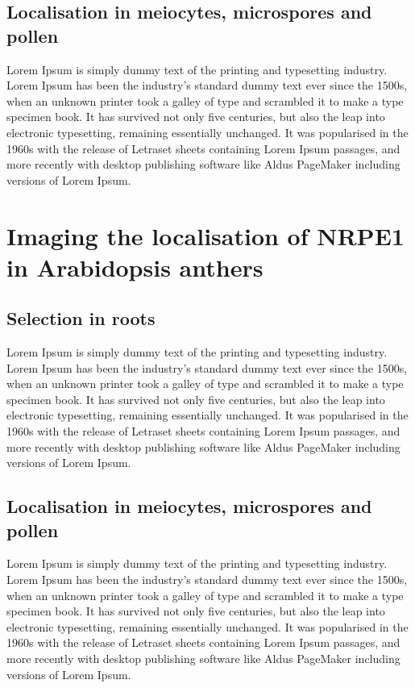 \subsection{Localisation in meiocytes, microspores and pollen}
Lorem Ipsum is simply dummy text of the printing and typesetting industry. Lorem Ipsum has been the industry's standard dummy text ever since the 1500s, when an unknown printer took a galley of type and scrambled it to make a type specimen book. It has survived not only five centuries, but also the leap into electronic typesetting, remaining essentially unchanged. It was popularised in the 1960s with the release of Letraset sheets containing Lorem Ipsum passages, and more recently with desktop publishing software like Aldus PageMaker including versions of Lorem Ipsum.

\section{Imaging the localisation of NRPE1 in Arabidopsis anthers}

\subsection{Selection in roots}
Lorem Ipsum is simply dummy text of the printing and typesetting industry. Lorem Ipsum has been the industry's standard dummy text ever since the 1500s, when an unknown printer took a galley of type and scrambled it to make a type specimen book. It has survived not only five centuries, but also the leap into electronic typesetting, remaining essentially unchanged. It was popularised in the 1960s with the release of Letraset sheets containing Lorem Ipsum passages, and more recently with desktop publishing software like Aldus PageMaker including versions of Lorem Ipsum.

\subsection{Localisation in meiocytes, microspores and pollen}
Lorem Ipsum is simply dummy text of the printing and typesetting industry. Lorem Ipsum has been the industry's standard dummy text ever since the 1500s, when an unknown printer took a galley of type and scrambled it to make a type specimen book. It has survived not only five centuries, but also the leap into electronic typesetting, remaining essentially unchanged. It was popularised in the 1960s with the release of Letraset sheets containing Lorem Ipsum passages, and more recently with desktop publishing software like Aldus PageMaker including versions of Lorem Ipsum.


